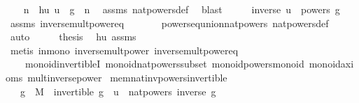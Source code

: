 \begin{isabellebody}
%
\isadelimproof
%
\endisadelimproof
%
\isatagproof
{}\isamarkupfalse%
{\isacharminus}{\kern0pt}\isanewline
\ \ \isamarkupfalse%
\ n\ \ hu{\isacharcolon}{\kern0pt}\ {\isachardoublequoteopen}u\ {\isacharequal}{\kern0pt}\ g\ {\isacharcircum}{\kern0pt}\ n{\isachardoublequoteclose}\ \isamarkupfalse%
\ assms\ nat{\isacharunderscore}{\kern0pt}powers{\isacharunderscore}{\kern0pt}def\ \isamarkupfalse%
\ blast\isanewline
\ \ \isamarkupfalse%
\ \isamarkupfalse%
\ {\isachardoublequoteopen}inverse\ u\ {\isasymin}\ powers\ g{\isachardoublequoteclose}\ \isamarkupfalse%
\ assms\ inverse{\isacharunderscore}{\kern0pt}mult{\isacharunderscore}{\kern0pt}power{\isacharunderscore}{\kern0pt}eq\ \isanewline
\ \ \ \ \ \ powers{\isacharunderscore}{\kern0pt}eq{\isacharunderscore}{\kern0pt}union{\isacharunderscore}{\kern0pt}nat{\isacharunderscore}{\kern0pt}powers\ nat{\isacharunderscore}{\kern0pt}powers{\isacharunderscore}{\kern0pt}def\ \isamarkupfalse%
\ auto\isanewline
\ \ \isamarkupfalse%
\ \isamarkupfalse%
\ {\isacharquery}{\kern0pt}thesis\ \isamarkupfalse%
\ hu\ assms\ \isamarkupfalse%
\ {\isacharparenleft}{\kern0pt}metis\ in{\isacharunderscore}{\kern0pt}mono\ inverse{\isacharunderscore}{\kern0pt}mult{\isacharunderscore}{\kern0pt}power\ inverse{\isacharunderscore}{\kern0pt}mult{\isacharunderscore}{\kern0pt}power{\isacharunderscore}{\kern0pt}eq\ \isanewline
\ \ \ \ monoid{\isachardot}{\kern0pt}invertibleI\ monoid{\isachardot}{\kern0pt}nat{\isacharunderscore}{\kern0pt}powers{\isacharunderscore}{\kern0pt}subset\ monoid{\isachardot}{\kern0pt}powers{\isacharunderscore}{\kern0pt}monoid\ monoid{\isacharunderscore}{\kern0pt}axioms\ mult{\isacharunderscore}{\kern0pt}inverse{\isacharunderscore}{\kern0pt}power{\isacharparenright}{\kern0pt}\isanewline
{}\isamarkupfalse%
%
\endisatagproof
{\isafoldproof}%
%
\isadelimproof
\isanewline
%
\endisadelimproof
\isanewline
{}\isamarkupfalse%
\ mem{\isacharunderscore}{\kern0pt}nat{\isacharunderscore}{\kern0pt}inv{\isacharunderscore}{\kern0pt}powers{\isacharunderscore}{\kern0pt}invertible{\isacharcolon}{\kern0pt}\isanewline
\ \ \ {\isachardoublequoteopen}g\ {\isasymin}\ M{\isachardoublequoteclose}\ \ {\isachardoublequoteopen}invertible\ g{\isachardoublequoteclose}\ \ {\isachardoublequoteopen}u\ {\isasymin}\ nat{\isacharunderscore}{\kern0pt}powers\ {\isacharparenleft}{\kern0pt}inverse\ g{\isacharparenright}{\kern0pt}{\isachardoublequoteclose}\isanewline

\end{isabellebody}
